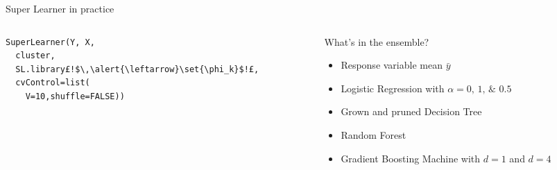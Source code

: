 \begin{frame}[fragile]{Super Learner in practice}


\begin{columns}[T]
\begin{column}{0.5\textwidth}
\begin{lstlisting}
SuperLearner(Y, X,
  cluster,
  SL.library£!$\,\alert{\leftarrow}\set{\phi_k}$!£,
  cvControl=list(
    V=10,shuffle=FALSE))
\end{lstlisting}

\end{column}
\begin{column}{0.5\textwidth}
\vspace{0.5em}What's in the ensemble?
	\begin{itemize}
		\item Response variable mean $\bar{y}$
		\item Logistic Regression with $\alpha=\numlist{0;1;0.5}$
		\item Grown and pruned Decision Tree
		\item Random Forest
		\item Gradient Boosting Machine with $d=1$ and $d=4$
	\end{itemize}
\end{column}
\end{columns}

\end{frame}


%
%
		
